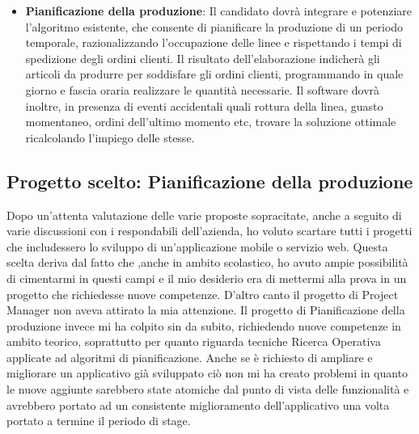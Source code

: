 \begin{itemize}
	\pagebreak
	\item \textbf{Pianificazione della produzione}: Il candidato dovrà integrare e potenziare l’algoritmo esistente, che consente di
	pianificare la produzione di un periodo temporale, razionalizzando l’occupazione delle
	linee e rispettando i tempi di spedizione degli ordini clienti.
	Il risultato dell’elaborazione indicherà gli articoli da produrre per soddisfare gli ordini
	clienti, programmando in quale giorno e fascia oraria realizzare le quantità necessarie. Il
	software dovrà inoltre, in presenza di eventi accidentali quali rottura della linea, guasto
	momentaneo, ordini dell’ultimo momento etc, trovare la soluzione ottimale
	ricalcolando l’impiego delle stesse.
	
	
\end{itemize}

\subsection{Progetto scelto: Pianificazione della produzione}
Dopo un'attenta valutazione delle varie proposte sopracitate, anche a seguito di varie discussioni con i respondabili dell'azienda, ho voluto scartare tutti i progetti che includessero lo sviluppo di un'applicazione mobile o servizio web. Questa scelta deriva dal fatto che ,anche in ambito scolastico, ho avuto ampie possibilità di cimentarmi in questi campi e il mio desiderio era di mettermi alla prova in un progetto che richiedesse nuove competenze. D'altro canto il progetto di Project Manager non aveva attirato la mia attenzione. Il progetto di Pianificazione della produzione invece mi ha colpito sin da subito, richiedendo nuove competenze in ambito teorico, soprattutto per quanto riguarda tecniche Ricerca Operativa applicate ad algoritmi di pianificazione. Anche se è richiesto di ampliare e migliorare un applicativo già sviluppato ciò non mi ha creato problemi in quanto le nuove aggiunte sarebbero state atomiche dal punto di vista delle funzionalità e avrebbero portato ad un consistente miglioramento dell'applicativo una volta portato a termine il periodo di stage.



